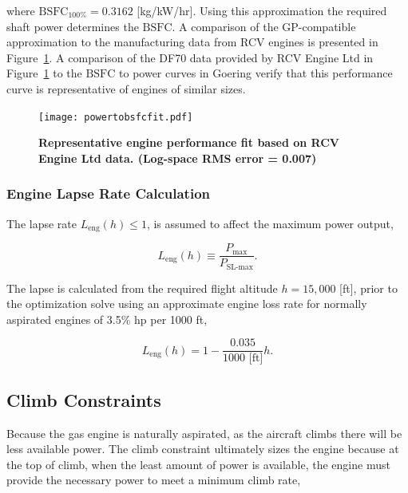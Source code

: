 where $\text{BSFC}_{100\%} = 0.3162$ [kg/kW/hr].\cite{rcvengines}
Using this approximation the required shaft power determines the $\text{BSFC}$.
A comparison of the GP-compatible approximation to the manufacturing data from RCV engines is presented in Figure~\ref{f:powervsweightfit}. A comparison of the DF70 data provided by RCV Engine Ltd in Figure~\ref{f:powervsweightfit} to the $\text{BSFC}$ to power curves in Goering\cite{bsfcperf} verify that this performance curve is representative of engines of similar sizes. 

\begin{figure}[H]
	\begin{center}
	\texttt{[image: powertobsfcfit.pdf]}
    \caption{\textbf{Representative engine performance fit based on RCV Engine Ltd data.  (Log-space RMS error = 0.007) }}
	\label{f:powervsweightfit}
	\end{center}
\end{figure}

\subsubsection{Engine Lapse Rate Calculation}

The lapse rate $L_{\text{eng}}(h) \leq 1$, is assumed to affect the maximum power output,

\begin{equation}
    \label{e:lapse}
    L_{\text{eng}}(h) \equiv \frac{P_{\text{max}}}{P_{\text{SL-max}}}.
\end{equation}

The lapse is calculated from the required flight altitude $h=15,000$ [ft], prior to the optimization solve using an approximate engine loss rate for normally aspirated engines of 3.5\% hp per 1000 ft,\cite{enginelapse}

\begin{equation}
    \label{e:lapsefit}
    L_{\text{eng}}(h) = 1 - \frac{0.035}{1000 \text{ [ft]}} h.
\end{equation}

\subsection{Climb Constraints}

Because the gas engine is naturally aspirated, as the aircraft climbs there will be less available power.  
The climb constraint ultimately sizes the engine because at the top of climb, when the least amount of power is available, the engine must provide the necessary power to meet a minimum climb rate, 

